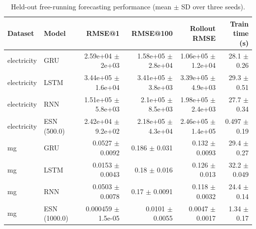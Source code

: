 \begin{table}[t]
\centering
\caption{Held-out free-running forecasting performance (mean $\pm$ SD over three seeds).}
\begin{tabular}{llrrrr}
\hline
Dataset & Model & RMSE@1 & RMSE@100 & Rollout RMSE & Train time (s) \\
\hline
electricity & GRU & 2.59e+04 $\pm$ 2e+03 & 1.58e+05 $\pm$ 2.8e+04 & 1.06e+05 $\pm$ 1.2e+04 & 28.1 $\pm$ 0.26 \\
electricity & LSTM & 3.44e+05 $\pm$ 1.6e+04 & 3.41e+05 $\pm$ 3.8e+03 & 3.39e+05 $\pm$ 4.9e+03 & 29.3 $\pm$ 0.51 \\
electricity & RNN & 1.51e+05 $\pm$ 5.8e+03 & 2.1e+05 $\pm$ 8.5e+03 & 1.98e+05 $\pm$ 2.4e+03 & 27.7 $\pm$ 0.34 \\
electricity & ESN (500.0) & 2.42e+04 $\pm$ 9.2e+02 & 2.18e+05 $\pm$ 4.3e+04 & 2.46e+05 $\pm$ 1.4e+05 & 0.497 $\pm$ 0.19 \\
\hline
mg & GRU & 0.0527 $\pm$ 0.0092 & 0.186 $\pm$ 0.031 & 0.132 $\pm$ 0.0093 & 29.4 $\pm$ 0.27 \\
mg & LSTM & 0.0153 $\pm$ 0.0043 & 0.18 $\pm$ 0.016 & 0.126 $\pm$ 0.013 & 32.2 $\pm$ 0.049 \\
mg & RNN & 0.0503 $\pm$ 0.0078 & 0.17 $\pm$ 0.0091 & 0.118 $\pm$ 0.0032 & 24.4 $\pm$ 0.14 \\
mg & ESN (1000.0) & 0.000459 $\pm$ 1.5e-05 & 0.0101 $\pm$ 0.0055 & 0.0047 $\pm$ 0.0017 & 1.34 $\pm$ 0.17 \\
\hline
\end{tabular}
\end{table}
